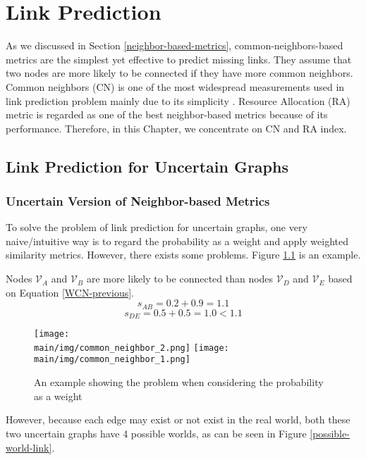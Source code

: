 \documentclass[\main/thesis.tex]{subfiles}
\begin{document}
\chapter{Link Prediction}
As we discussed in Section \ref{neighbor-based-metrics}, common-neighbors-based metrics are the simplest yet effective to predict missing links. They assume that two nodes are more likely to be connected if they have more common neighbors. Common neighbors (CN) is one of the most widespread measurements used in link prediction problem mainly due to its simplicity \cite{newman2001clustering}. Resource Allocation (RA) metric \cite{zhou2009predicting} is regarded as one of the best neighbor-based metrics because of its performance. Therefore, in this Chapter, we concentrate on CN and RA index.
\section{Link Prediction for Uncertain Graphs}
\subsection{Uncertain Version of Neighbor-based Metrics} \label{Uncertain-Version-of-Neighbor-based-Metrics}
To solve the problem of link prediction for uncertain graphs, one very naive/intuitive way is to regard the probability as a weight and apply weighted similarity metrics. However, there exists some problems. Figure \ref{problem-consider-probability-as-weight-link} is an example.

Nodes $\mathcal{V}_A$ and $\mathcal{V}_B$ are more likely to be connected than nodes $\mathcal{V}_D$ and $\mathcal{V}_E$ based on Equation \ref{WCN-previous}.
\begin{equation}
s_{AB} = 0.2 + 0.9 = 1.1
\end{equation}
\begin{equation}
s_{DE} = 0.5 + 0.5 = 1.0 < 1.1
\end{equation}

\begin{figure}
\texttt{[image: \\main/img/common\_neighbor\_2.png]}
\texttt{[image: \\main/img/common\_neighbor\_1.png]}
\centering
\caption{An example showing the problem when considering the probability as a weight}
\label{problem-consider-probability-as-weight-link}
\end{figure}

However, because each edge may exist or not exist in the real world, both these two uncertain graphs have 4 possible worlds, as can be seen in Figure \ref{possible-world-link}.
\end{document}
